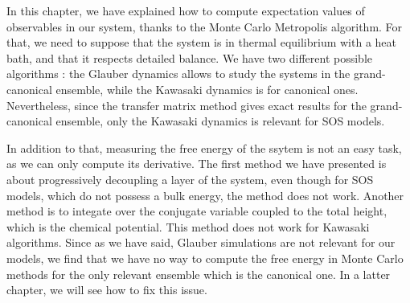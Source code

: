 In this chapter, we have explained how to compute expectation values of observables in our system, thanks to the Monte Carlo Metropolis algorithm. For that, we need to suppose that the system is in thermal equilibrium with a heat bath, and that it respects detailed balance. We have two different possible algorithms : the Glauber dynamics allows to study the systems in the grand-canonical ensemble, while the Kawasaki dynamics is for canonical ones. Nevertheless, since the transfer matrix method gives exact results for the grand-canonical ensemble, only the Kawasaki dynamics is relevant for SOS models. 

In addition to that, measuring the free energy of the ssytem is not an easy task, as we can only compute its derivative. The first method we have presented is about progressively decoupling a layer of the system, even though for SOS models, which do not possess a bulk energy, the method does not work. Another method is to integate over the conjugate variable coupled to the total height, which is the chemical potential. This method does not work for Kawasaki algorithms. 
Since as we have said, Glauber simulations are not relevant for our models, we find that we have no way to compute the free energy in Monte Carlo methods for the only relevant ensemble which is the canonical one. In a latter chapter, we will see how to fix this issue.
